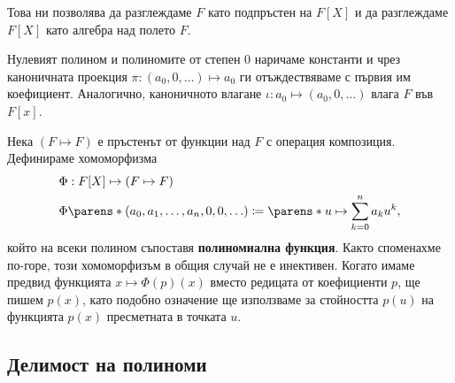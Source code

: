 \documentclass{../../common/topic}
\begin{document}
Това ни позволява да разглеждаме \( F \) като подпръстен на \( F[X] \) и да разглеждаме \( F[X] \) като алгебра над полето \( F \).

Нулевият полином и полиномите от степен \( 0 \) наричаме константи и чрез каноничната проекция \( \pi: (a_0, 0, \ldots) \mapsto a_0 \) ги отъждествяваме с първия им коефициент. Аналогично, каноничното влагане \( \iota: a_0 \mapsto (a_0, 0, \ldots) \) влага \( F \) във \( F[x] \).

Нека \( (F \mapsto F) \) е пръстенът от функции над \( F \) с операция композиция. Дефинираме хомоморфизма
\begin{align*}
  &\Phi: F[X] \mapsto (F \mapsto F) \\
  &\Phi\parens*{(a_0, a_1, \ldots, a_n, 0, 0, \ldots) } \coloneqq \parens*{ u \mapsto \sum_{k=0}^n a_k u^k },
\end{align*}
който на всеки полином съпоставя \textbf{полиномиална функция}. Както споменахме по-горе, този хомоморфизъм в общия случай не е инективен. Когато имаме предвид функцията \( x \mapsto \Phi(p)(x) \) вместо редицата от коефициенти \( p \), ще пишем \( p(x) \), като подобно означение ще използваме за стойността \( p(u) \) на функцията \( p(x) \) пресметната в точката \( u \).

\subsection{Делимост на полиноми}
\end{document}
